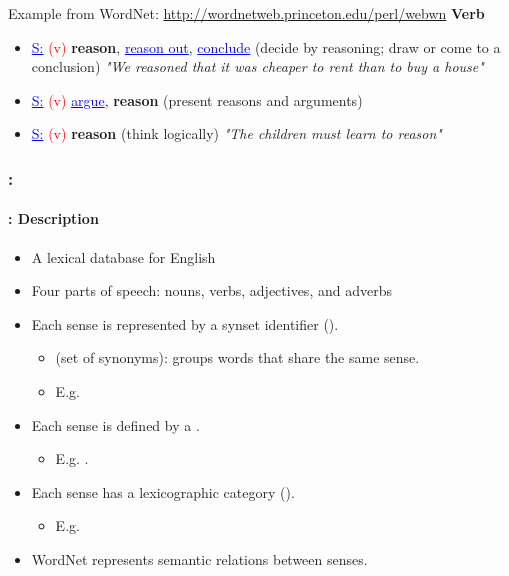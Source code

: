 \documentclass[xcolor=table]{beamer}
\begin{document}
\begin{frame}
\begin{exampleblock}{Example from WordNet: \small\url{http://wordnetweb.princeton.edu/perl/webwn}}
		{\small\bfseries Verb}
		\begin{itemize}\setlength\itemsep{0pt}
			\item \textcolor{blue}{\underline{S:}} \textcolor{red}{(v)} \textbf{reason}, \textcolor{blue}{\underline{reason out}}, \textcolor{blue}{\underline{conclude}} (decide by reasoning; draw or come to a conclusion) \textit{"We reasoned that it was cheaper to rent than to buy a house"}
			\item \textcolor{blue}{\underline{S:}} \textcolor{red}{(v)} \textcolor{blue}{\underline{argue}}, \textbf{reason} (present reasons and arguments)
			\item \textcolor{blue}{\underline{S:}} \textcolor{red}{(v)} \textbf{reason} (think logically) \textit{"The children must learn to reason"}
		\end{itemize}
	\end{exampleblock}
	
\end{frame}

\begin{frame}
	\frametitle{\insertshortsubtitle: \insertsection}
	\framesubtitle{\insertsubsection: Description}
	
	\begin{itemize}
		\item A lexical database for English \cite{1995-miller}
		\item Four parts of speech: nouns, verbs, adjectives, and adverbs
		\item Each sense is represented by a synset identifier ().
		\begin{itemize}
			\item {} (set of synonyms): groups words that share the same sense.
			\item E.g. 
		\end{itemize}
		\item Each sense is defined by a .
		\begin{itemize}
			\item E.g. .
		\end{itemize}
		\item Each sense has a lexicographic category ().
		\begin{itemize}
			\item E.g. 
		\end{itemize}
		\item WordNet represents semantic relations between senses.
	\end{itemize}
	
\end{frame}
\end{document}
